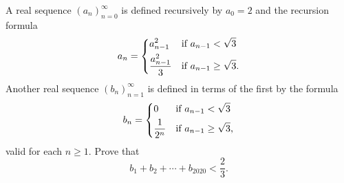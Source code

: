 A real sequence $(a_n)_{n=0}^\infty$ is defined recursively by $a_0 = 2$ and the recursion formula
$$
a_{n} = 
\begin{dcases}
a_{n-1}^2 & \text{if $a_{n-1}<\sqrt3$} \\
\frac{a_{n-1}^2}{3} & \text{if $a_{n-1}\geq\sqrt 3$.}
\end{dcases} 
$$Another real sequence $(b_n)_{n=1}^\infty$ is defined in terms of the first by the formula
$$
b_{n} =
\begin{dcases}
0 & \text{if $a_{n-1}<\sqrt3$} \\
\frac{1}{2^{n}} & \text{if $a_{n-1}\geq\sqrt 3$,}
\end{dcases}
$$valid for each $n\geq 1$. Prove that
$$
b_1 + b_2 + \cdots + b_{2020} < \frac23.
$$
